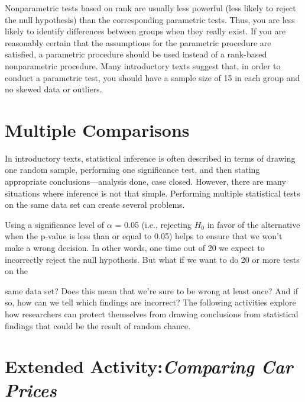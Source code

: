 \documentclass[
]{report}
\theoremstyle{definition}
\theoremstyle{definition}
\theoremstyle{definition}
\theoremstyle{definition}
\theoremstyle{remark}
\begin{document}
\normalsize

Nonparametric tests based on rank are usually less powerful (less likely to reject the null hypothesis) than the corresponding parametric tests. Thus, you are less likely to identify differences between groups when they really exist. If you are reasonably certain that the assumptions for the parametric procedure are satisfied, a parametric procedure should be used instead of a rank-based nonparametric procedure. Many introductory texts suggest that, in order to conduct a parametric test, you should have a sample size of 15 in each group and no skewed data or outliers.

\hypertarget{multiple-comparisons}{%
\section{\texorpdfstring{\textbf{Multiple Comparisons}}{Multiple Comparisons}}\label{multiple-comparisons}}

In introductory texts, statistical inference is often described in terms of drawing one random sample, performing one significance test, and then stating appropriate conclusions---analysis done, case closed. However, there are many situations where inference is not that simple. Performing multiple statistical tests on the same data set can create several problems.

Using a significance level of \(\alpha\) = 0.05 (i.e., rejecting \(H_0\) in favor of the alternative when the p-value is less than or equal to 0.05) helps to ensure that we won't make a wrong decision. In other words, one time out of 20 we expect to incorrectly reject the null hypothesis. But what if we want to do 20 or more tests on the

same data set? Does this mean that we're sure to be wrong at least once? And if so, how can we tell which findings are incorrect? The following activities explore how researchers can protect themselves from drawing conclusions from statistical findings that could be the result of random chance.

\hypertarget{extended-activitycomparing-car-prices}{%
\section*{\texorpdfstring{Extended Activity:\emph{Comparing Car Prices}}{Extended Activity:Comparing Car Prices}}\label{extended-activitycomparing-car-prices}}
\end{document}
